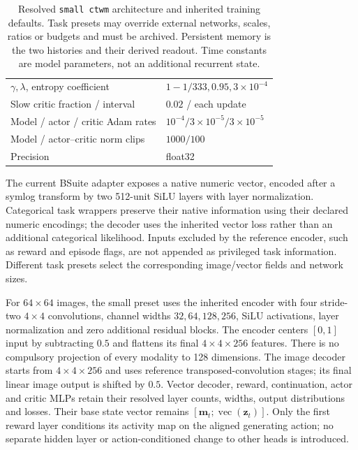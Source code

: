 \documentclass{article}
\begin{document}
\begin{table}[t]
\begin{tabular}{@{}p{}p{}@{}}
$\gamma,\lambda$, entropy coefficient & $1-1/333,0.95,3\times10^{-4}$\\
Slow critic fraction / interval & $0.02$ / each update\\
Model / actor / critic Adam rates & $10^{-4}/3\times10^{-5}/3\times10^{-5}$\\
Model / actor--critic norm clips & $1000/100$\\
Precision & float32\\
\bottomrule
\end{tabular}
\caption{Resolved \texttt{small ctwm} architecture and inherited training defaults. Task presets may override external networks, scales, ratios or budgets and must be archived. Persistent memory is the two histories and their derived readout. Time constants are model parameters, not an additional recurrent state.}
\label{tab:reference_config}
\end{table}

The current BSuite adapter exposes a native numeric vector, encoded after a symlog transform by two 512-unit SiLU layers with layer normalization. Categorical task wrappers preserve their native information using their declared numeric encodings; the decoder uses the inherited vector loss rather than an additional categorical likelihood. Inputs excluded by the reference encoder, such as reward and episode flags, are not appended as privileged task information. Different task presets select the corresponding image/vector fields and network sizes.

For $64\times64$ images, the small preset uses the inherited encoder with four stride-two $4\times4$ convolutions, channel widths $32,64,128,256$, SiLU activations, layer normalization and zero additional residual blocks. The encoder centers $[0,1]$ input by subtracting $0.5$ and flattens its final $4\times4\times256$ features. There is no compulsory projection of every modality to 128 dimensions. The image decoder starts from $4\times4\times256$ and uses reference transposed-convolution stages; its final linear image output is shifted by $0.5$. Vector decoder, reward, continuation, actor and critic MLPs retain their resolved layer counts, widths, output distributions and losses. Their base state vector remains $[\mathbf m_t;\operatorname{vec}(\mathbf z_t)]$. Only the first reward layer conditions its activity map on the aligned generating action; no separate hidden layer or action-conditioned change to other heads is introduced.
\end{document}
